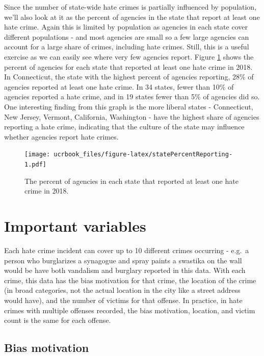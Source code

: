 \documentclass[
  12pt,
  openany]{book}
\begin{document}
Since the number of state-wide hate crimes is partially influenced by population, we'll also look at it as the percent of agencies in the state that report at least one hate crime. Again this is limited by population as agencies in each state cover different populations - and most agencies are small so a few large agencies can account for a large share of crimes, including hate crimes. Still, this is a useful exercise as we can easily see where very few agencies report. Figure \ref{fig:statePercentReporting} shows the percent of agencies for each state that reported at least one hate crime in 2018. In Connecticut, the state with the highest percent of agencies reporting, 28\% of agencies reported at least one hate crime. In 34 states, fewer than 10\% of agencies reported a hate crime, and in 19 states fewer than 5\% of agencies did so. One interesting finding from this graph is the more liberal states - Connecticut, New Jersey, Vermont, California, Washington - have the highest share of agencies reporting a hate crime, indicating that the culture of the state may influence whether agencies report hate crimes.

\begin{figure}
\centering
\texttt{[image: ucrbook\_files/figure-latex/statePercentReporting-1.pdf]}
\caption{\label{fig:statePercentReporting}The percent of agencies in each state that reported at least one hate crime in 2018.}
\end{figure}

\hypertarget{important-variables-1}{%
\section{Important variables}\label{important-variables-1}}

Each hate crime incident can cover up to 10 different crimes occurring - e.g.~a person who burglarizes a synagogue and spray paints a swastika on the wall would be have both vandalism and burglary reported in this data. With each crime, this data has the bias motivation for that crime, the location of the crime (in broad categories, not the actual location in the city like a street address would have), and the number of victims for that offense. In practice, in hate crimes with multiple offenses recorded, the bias motivation, location, and victim count is the same for each offense.

\hypertarget{bias-motivation}{%
\subsection{Bias motivation}\label{bias-motivation}}
\end{document}
